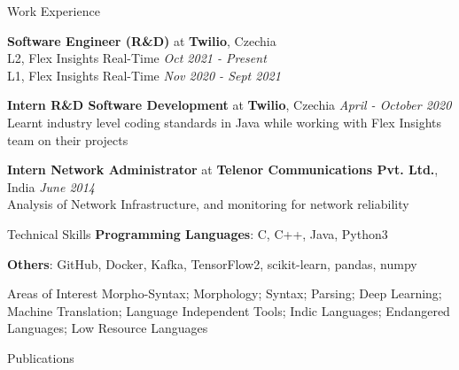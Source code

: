 \documentclass{resume}
\begin{document}
\begin{rSection}{Work Experience}

    {\textbf{Software Engineer (R\&D)} at \textbf{Twilio}, Czechia}\\
            L2, Flex Insights Real-Time \hfill \textit{Oct 2021 - Present}\\
            L1, Flex Insights Real-Time \hfill \textit{Nov 2020 - Sept 2021}
            
    {\textbf{Intern R\&D Software Development} at \textbf{Twilio}, Czechia}
        \hfill {\em April - October 2020}\\
            Learnt industry level coding standards in Java while working with Flex Insights team on their projects

    {\textbf{Intern Network Administrator} at \textbf{Telenor Communications Pvt. Ltd.}, India}
        \hfill {\em June 2014}\\
            Analysis of Network Infrastructure, and monitoring for 
            network reliability

\end{rSection}



\begin{rSection}{Technical Skills}
    {\textbf{Programming Languages}: C, C++, Java, Python3}
    
    {\textbf{Others}: GitHub, Docker, Kafka, TensorFlow2, scikit-learn, pandas, numpy}
    
    \begin{rSubsection}{Areas of Interest}{}{}{}
        Morpho-Syntax; Morphology; Syntax; Parsing; Deep Learning; Machine Translation; 
        Language Independent Tools; Indic Languages; Endangered Languages; Low Resource 
        Languages
    \end{rSubsection}
\end{rSection}


\begin{rSection}{Publications}

    {}

    {}

    {}
    
    \newpage
    {}

    {}

\end{rSection}
\end{document}
